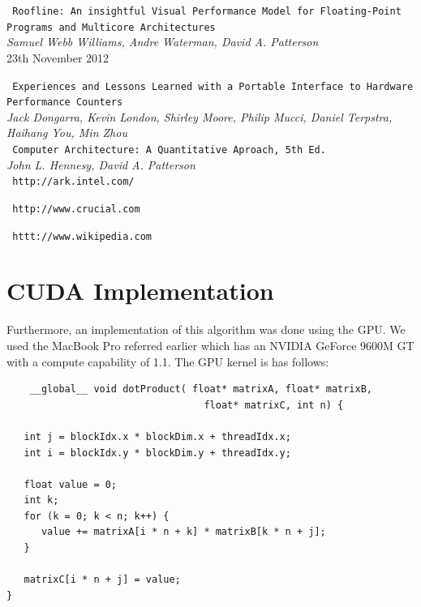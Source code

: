 \documentclass[a4paper,10pt,openright,openbib,twocolumn]{article}
\begin{document}
\begin{thebibliography}{99}
	\texttt{\small
	Roofline: An insightful Visual Performance Model for Floating-Point Programs and Multicore Architectures}	\\
	\emph{Samuel Webb Williams, Andre Waterman, David A. Patterson}	\\
	23th November 2012

	\texttt{\small
	Experiences and Lessons Learned with a Portable Interface to Hardware Performance Counters}	\\
	\emph{Jack Dongarra, Kevin London, Shirley Moore, Philip Mucci, Daniel Terpstra, Haihang You, Min Zhou}	\\	


	\texttt{\small
	Computer Architecture: A Quantitative Aproach, 5th Ed.}	\\
	\emph{John L. Hennesy, David A. Patterson}	\\	

	\texttt{\small
	http://ark.intel.com/}

	\texttt{\small
	http://www.crucial.com}

	\texttt{\small
	httt://www.wikipedia.com}




\end{thebibliography}

\appendix
\appendixpage
\section{CUDA Implementation}
Furthermore, an implementation of this algorithm was done using the GPU. We used the MacBook Pro referred earlier which has an NVIDIA GeForce 9600M GT with a compute capability of 1.1. The GPU kernel is has follows:

\begin{verbatim}
	__global__ void dotProduct( float* matrixA, float* matrixB, 
	                              float* matrixC, int n) {
 
   int j = blockIdx.x * blockDim.x + threadIdx.x;
   int i = blockIdx.y * blockDim.y + threadIdx.y;
      
   float value = 0;
   int k;
   for (k = 0; k < n; k++) {  	    	 
      value += matrixA[i * n + k] * matrixB[k * n + j];           
   }  

   matrixC[i * n + j] = value;
}
\end{verbatim}
\end{document}
